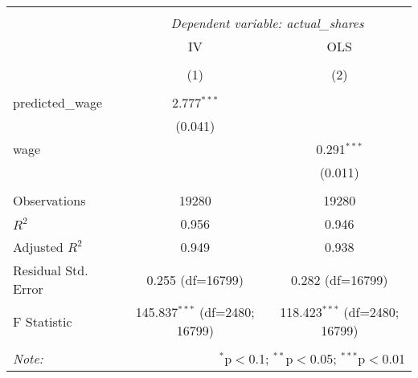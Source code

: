 \begin{table}[!htbp] \centering
\begin{tabular}{@{\extracolsep{5pt}}lcc}
\\[-1.8ex]\hline
\hline \\[-1.8ex]
& \multicolumn{2}{c}{\textit{Dependent variable: actual\_shares}} \
\cr \cline{2-3}
\\[-1.8ex] & \multicolumn{1}{c}{IV} & \multicolumn{1}{c}{OLS}  \\
\\[-1.8ex] & (1) & (2) \\
\hline \\[-1.8ex]
 predicted\_wage & 2.777$^{***}$ & \\
& (0.041) & \\
 wage & & 0.291$^{***}$ \\
& & (0.011) \\
\hline \\[-1.8ex]
 Observations & 19280 & 19280 \\
 $R^2$ & 0.956 & 0.946 \\
 Adjusted $R^2$ & 0.949 & 0.938 \\
 Residual Std. Error & 0.255 (df=16799) & 0.282 (df=16799) \\
 F Statistic & 145.837$^{***}$ (df=2480; 16799) & 118.423$^{***}$ (df=2480; 16799) \\
\hline
\hline \\[-1.8ex]
\textit{Note:} & \multicolumn{2}{r}{$^{*}$p$<$0.1; $^{**}$p$<$0.05; $^{***}$p$<$0.01} \\
\end{tabular}
\end{table}